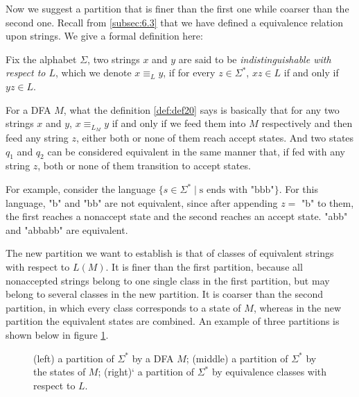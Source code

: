 \documentclass[11pt]{article}
\begin{document}
Now we suggest a partition that is finer than the first one while coarser
than the second one. Recall from \ref{subsec:6.3} that we have defined a
equivalence relation upon strings. We give a formal definition here:

\begin{definition} \label{def:def20}
Fix the alphabet $\Sigma$, two strings $x$ and $y$ are said to be
\emph{indistinguishable with respect to $L$}, which we denote $x \equiv_L y$,
if for every $z \in \Sigma ^\ast$, $xz \in L$ if and only if $yz \in L$.
\end{definition}

For a DFA $M$, what the definition \ref{def:def20} says is basically that
for any two strings $x$ and $y$, $x \equiv_{L_M} y$ if and only if we feed
them into $M$ respectively and then feed any string $z$, either both or none
of them reach accept states. And two states $q_1$ and $q_2$ can be considered
equivalent in the same manner that, if fed with any string $z$, both or none
of them transition to accept states.

For example, consider the language $\{s \in \Sigma^\ast \mid \text{s ends
with "bbb"}\}$. For this language, "b" and "bb" are not equivalent, since
after appending $z =$ "b" to them, the first reaches a nonaccept state
and the second reaches an accept state. "abb" and "abbabb" are equivalent.

The new partition we want to establish is that of classes of equivalent
strings with respect to $L(M)$. It is finer than the first partition,
because all nonaccepted strings belong to one single class in the first
partition, but may belong to several classes in the new partition. It is
coarser than the second partition, in which every class corresponds to a
state of $M$, whereas in the new partition the equivalent states are
combined. An example of three partitions is shown below in figure
\ref{fig:fig29}.

\begin{figure}
\centering
{}
\caption{(left) a partition of $\Sigma^\ast$ by a DFA $M$; (middle) a
partition of $\Sigma^\ast$ by the states of $M$; (right)` a partition of
$\Sigma^\ast$ by equivalence classes with respect to $L$.}
\label{fig:fig29}
\end{figure}
\end{document}
